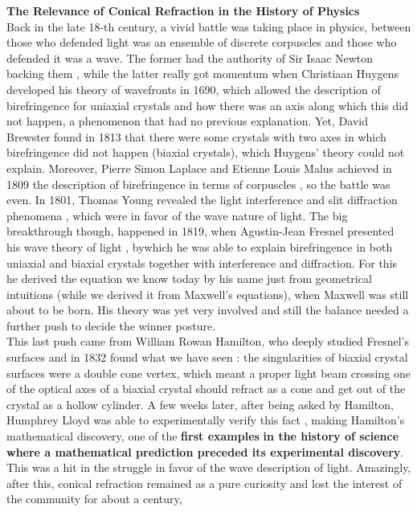 \documentclass[11pt, a4paper, twoside]{article} %
\DeclareRobustCommand{\mybox}[2][gray!10]{%
\begin{tcolorbox}[   %
        left=0.2cm,
        right=0.2cm,
        top=0.15cm,
        bottom=0.15cm,
        colback=#1,
        colframe=#1,
        width=\dimexpr\textwidth\relax, 
        enlarge left by=0mm,
        boxsep=5pt,
        arc=0pt,outer arc=0pt,
        ]
        #2
\end{tcolorbox}
}
\begin{document}
\mybox{{\bf The Relevance of Conical Refraction in the History of Physics}\vspace{0.2cm}\\
Back in the late 18-th century, a vivid battle was taking place in physics, between those who defended light was an ensemble of discrete corpuscles and those who defended it was a wave. The former had the authority of Sir Isaac Newton backing them \cite{newton}, while the latter really got momentum when Christiaan Huygens developed his theory of wavefronts \cite{huygens} in 1690, which allowed the description of birefringence for uniaxial crystals and how there was an axis along which this did not happen, a phenomenon that had no previous explanation. Yet, David Brewster found in 1813 that there were some crystals with two axes in which birefringence did not happen (biaxial crystals), which Huygens' theory could not explain. Moreover, Pierre Simon Laplace and Etienne Louis Malus achieved in 1809 the description of birefringence in terms of corpuscles \cite{laplace,malus}, so the battle was even. In 1801, Thomas Young revealed the light interference and slit diffraction phenomena \cite{young}, which were in favor of the wave nature of light. The big breakthrough though, happened in 1819, when Agustin-Jean Fresnel presented his wave theory of light \cite{fresnel}, bywhich he was able to explain birefringence in both uniaxial and biaxial crystals together with interference and diffraction. For this he derived the equation we know today by his name just from geometrical intuitions (while we derived it from Maxwell's equations), when Maxwell was still about to be born. His theory was yet very involved and still the balance needed a further push to decide the winner posture.\\

This last push came from William Rowan Hamilton, who deeply studied Fresnel's surfaces and in 1832 found what we have seen \cite{hamilton}: the singularities of biaxial crystal surfaces were a double cone vertex, which meant a proper light beam crossing one of the optical axes of a biaxial crystal should refract as a cone and get out of the crystal as a hollow cylinder. A few weeks later, after being asked by Hamilton, Humphrey Lloyd was able to experimentally verify this fact \cite{lloyd}, making Hamilton's mathematical discovery, one of the {\bf first examples} {\bf in the history of science where a mathematical prediction preceded its experimental discovery}. This was a hit in the struggle in favor of the wave description of light. Amazingly, after this, conical refraction remained as a pure curiosity and lost the interest of the community for about a century,}
\end{document}

